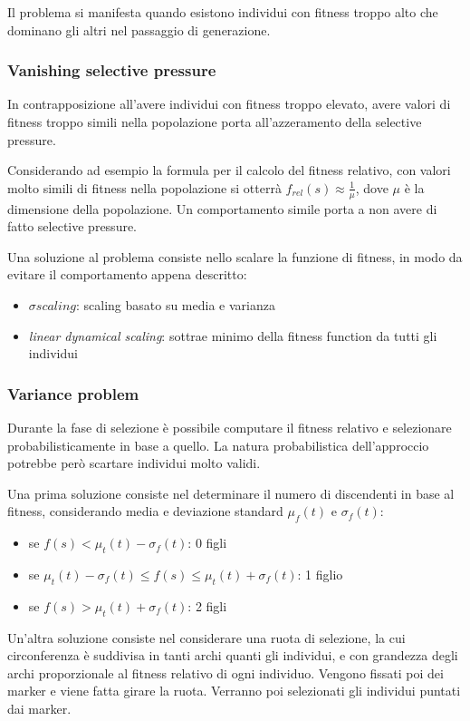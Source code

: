 \documentclass[a4paper]{article}
\begin{document}
Il problema si manifesta quando esistono individui con fitness troppo alto che dominano gli altri
nel passaggio di generazione.

\subsubsection{Vanishing selective pressure}
In contrapposizione all'avere individui con fitness troppo elevato, 
avere valori di fitness troppo simili nella popolazione porta all'azzeramento della selective pressure.

Considerando ad esempio la formula per il calcolo del fitness relativo, 
con valori molto simili di fitness nella popolazione si otterrà $f_{rel}(s) \approx \frac{1}{\mu}$, 
dove $\mu$ è la dimensione della popolazione.
Un comportamento simile porta a non avere di fatto selective pressure.

Una soluzione al problema consiste nello scalare la funzione di fitness, in 
modo da evitare il comportamento appena descritto:
\begin{itemize}
    \item $\sigma scaling$: scaling basato su media e varianza
    \item \emph{linear dynamical scaling}: sottrae minimo della fitness function da tutti gli individui 
\end{itemize}

\subsubsection{Variance problem}
Durante la fase di selezione è possibile computare il fitness relativo e selezionare 
probabilisticamente in base a quello.
La natura probabilistica dell'approccio potrebbe però scartare individui molto validi.

Una prima soluzione consiste nel determinare il numero di discendenti in base 
al fitness, considerando media e deviazione standard $\mu_f(t)$ e $\sigma_f(t)$:
\begin{itemize}
    \item se $f(s) < \mu_t(t) - \sigma_f(t)$: 0 figli
    \item se $\mu_t(t) - \sigma_f(t) \leq f(s) \leq \mu_t(t) + \sigma_f(t)$: 1 figlio
    \item se $f(s) > \mu_t(t) + \sigma_f(t)$: 2 figli
\end{itemize} 

Un'altra soluzione consiste nel considerare una ruota di selezione, 
la cui circonferenza è suddivisa in tanti archi quanti gli individui, e con grandezza
degli archi proporzionale al fitness relativo di ogni individuo.
Vengono fissati poi dei marker e viene fatta girare la ruota.
Verranno poi selezionati gli individui puntati dai marker.
\end{document}
